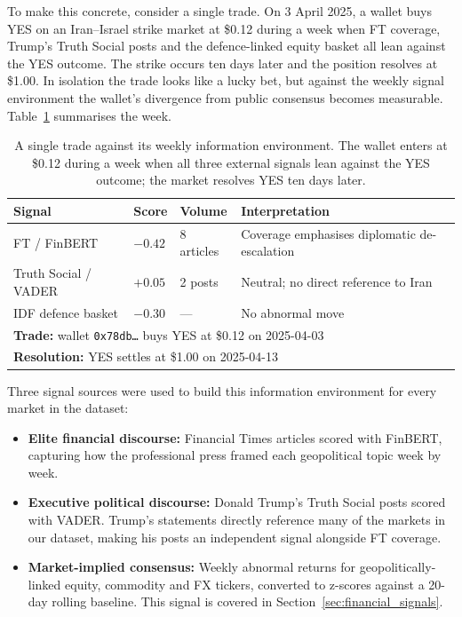 \documentclass[11pt,a4paper]{article}
\begin{document}
To make this concrete, consider a single trade. On 3 April 2025, a
wallet buys YES on an Iran--Israel strike market at \$0.12 during a
week when FT coverage, Trump's Truth Social posts and the
defence-linked equity basket all lean against the YES outcome. The
strike occurs ten days later and the position resolves at \$1.00.
In isolation the trade looks like a lucky bet, but against the
weekly signal environment the wallet's divergence from public
consensus becomes measurable. Table~\ref{tab:signal_motivation}
summarises the week.\\

\begin{table}[H]
\centering
\caption{A single trade against its weekly information environment.
         The wallet enters at \$0.12 during a week when all three
         external signals lean against the YES outcome; the market
         resolves YES ten days later.}
\label{tab:signal_motivation}
\small
\begin{tabularx}{\textwidth}{l l l X}
\toprule
\textbf{Signal} & \textbf{Score} & \textbf{Volume} & \textbf{Interpretation} \\
\midrule
FT / FinBERT            & $-0.42$ & 8 articles & Coverage emphasises diplomatic de-escalation \\
Truth Social / VADER    & $+0.05$ & 2 posts    & Neutral; no direct reference to Iran \\
IDF defence basket      & $-0.30$ & ---        & No abnormal move \\
\midrule
\multicolumn{4}{l}{\textbf{Trade:} wallet \texttt{0x78db\ldots} buys YES at \$0.12 on 2025-04-03} \\
\multicolumn{4}{l}{\textbf{Resolution:} YES settles at \$1.00 on 2025-04-13} \\
\bottomrule
\end{tabularx}
\end{table}

Three signal sources were used to build this information environment
for every market in the dataset:

\begin{itemize}
    \item \textbf{Elite financial discourse:} Financial Times articles
          scored with FinBERT, capturing how the professional press
          framed each geopolitical topic week by week.
    \item \textbf{Executive political discourse:} Donald Trump's Truth
          Social posts scored with VADER. Trump's statements directly
          reference many of the markets in our dataset, making his
          posts an independent signal alongside FT coverage.
    \item \textbf{Market-implied consensus:} Weekly abnormal returns
          for geopolitically-linked equity, commodity and FX tickers,
          converted to z-scores against a 20-day rolling baseline.
          This signal is covered in Section~\ref{sec:financial_signals}.
\end{itemize}
\end{document}
